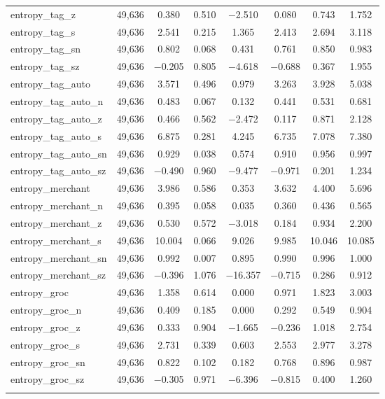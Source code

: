 \begin{table}[!htbp]
\begin{tabular}{@{\extracolsep{5pt}}lccccccc}
entropy\_tag\_z & 49,636 & 0.380 & 0.510 & $-$2.510 & 0.080 & 0.743 & 1.752 \\ 
entropy\_tag\_s & 49,636 & 2.541 & 0.215 & 1.365 & 2.413 & 2.694 & 3.118 \\ 
entropy\_tag\_sn & 49,636 & 0.802 & 0.068 & 0.431 & 0.761 & 0.850 & 0.983 \\ 
entropy\_tag\_sz & 49,636 & $-$0.205 & 0.805 & $-$4.618 & $-$0.688 & 0.367 & 1.955 \\ 
entropy\_tag\_auto & 49,636 & 3.571 & 0.496 & 0.979 & 3.263 & 3.928 & 5.038 \\ 
entropy\_tag\_auto\_n & 49,636 & 0.483 & 0.067 & 0.132 & 0.441 & 0.531 & 0.681 \\ 
entropy\_tag\_auto\_z & 49,636 & 0.466 & 0.562 & $-$2.472 & 0.117 & 0.871 & 2.128 \\ 
entropy\_tag\_auto\_s & 49,636 & 6.875 & 0.281 & 4.245 & 6.735 & 7.078 & 7.380 \\ 
entropy\_tag\_auto\_sn & 49,636 & 0.929 & 0.038 & 0.574 & 0.910 & 0.956 & 0.997 \\ 
entropy\_tag\_auto\_sz & 49,636 & $-$0.490 & 0.960 & $-$9.477 & $-$0.971 & 0.201 & 1.234 \\ 
entropy\_merchant & 49,636 & 3.986 & 0.586 & 0.353 & 3.632 & 4.400 & 5.696 \\ 
entropy\_merchant\_n & 49,636 & 0.395 & 0.058 & 0.035 & 0.360 & 0.436 & 0.565 \\ 
entropy\_merchant\_z & 49,636 & 0.530 & 0.572 & $-$3.018 & 0.184 & 0.934 & 2.200 \\ 
entropy\_merchant\_s & 49,636 & 10.004 & 0.066 & 9.026 & 9.985 & 10.046 & 10.085 \\ 
entropy\_merchant\_sn & 49,636 & 0.992 & 0.007 & 0.895 & 0.990 & 0.996 & 1.000 \\ 
entropy\_merchant\_sz & 49,636 & $-$0.396 & 1.076 & $-$16.357 & $-$0.715 & 0.286 & 0.912 \\ 
entropy\_groc & 49,636 & 1.358 & 0.614 & 0.000 & 0.971 & 1.823 & 3.003 \\ 
entropy\_groc\_n & 49,636 & 0.409 & 0.185 & 0.000 & 0.292 & 0.549 & 0.904 \\ 
entropy\_groc\_z & 49,636 & 0.333 & 0.904 & $-$1.665 & $-$0.236 & 1.018 & 2.754 \\ 
entropy\_groc\_s & 49,636 & 2.731 & 0.339 & 0.603 & 2.553 & 2.977 & 3.278 \\ 
entropy\_groc\_sn & 49,636 & 0.822 & 0.102 & 0.182 & 0.768 & 0.896 & 0.987 \\ 
entropy\_groc\_sz & 49,636 & $-$0.305 & 0.971 & $-$6.396 & $-$0.815 & 0.400 & 1.260 \\ 
\hline \\[-1.8ex] 
\end{tabular} 
\end{table} 
